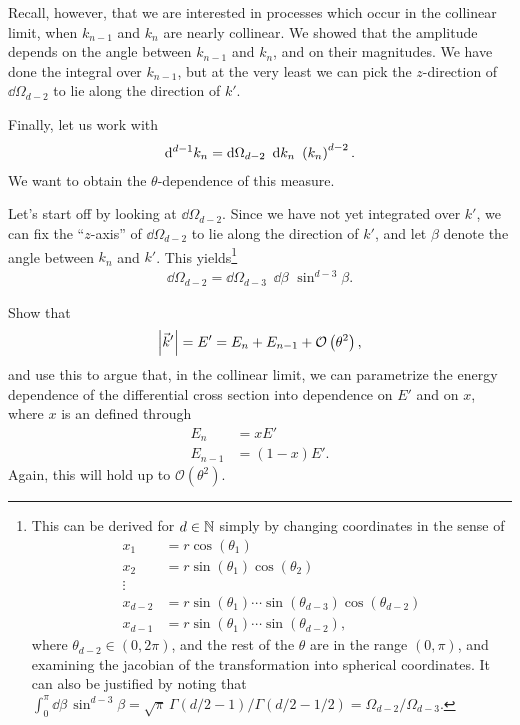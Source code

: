 Recall, however, that we are interested in processes which occur in the collinear limit, when \(k_{n-1}\) and \(k_{n}\) are nearly collinear.
%
We showed that the amplitude depends on the angle between \(k_{n-1}\) and \(k_n\), and on their magnitudes.
%
We have done the integral over \(k_{n-1}\), but at the very least we can pick the \(z\)-direction of \(\dd \Omega_{d-2}\) to lie along the direction of \(k'\).

Finally, let us work with
\begin{align}
    \label{eq:n_measure}
    \dd^{d-1} k_n
    =
    \dd \Omega_{d-2}
    \,\,\,
    \dd k_n
    \,\,
    \le(k_n\ri)^{d-2}
    .
\end{align}
%
We want to obtain the \(\theta\)-dependence of this measure.

Let's start off by looking at \(\dd \Omega_{d-2}\).
%
Since we have not yet integrated over \(k'\), we can fix the ``\(z\)-axis'' of \(\dd\Omega_{d-2}\) to lie along the direction of \(k'\), and let \(\beta\) denote the angle between \(k_n\) and \(k'\).
%
This yields\footnote{
    This can be derived for \(d \in \mathbb N\) simply by changing coordinates in the sense of
    \begin{align}
        x_1 &= r \cos(\theta_1)
        \\
        x_2 &= r \sin(\theta_1)\cos(\theta_2)
        \\
        \vdots
        \\
        x_{d-2} &= r \sin(\theta_1)\cdots\sin(\theta_{d-3})\cos(\theta_{d-2})
        \\
        x_{d-1} &= r \sin(\theta_1)\cdots\sin(\theta_{d-2})
        ,
    \end{align}
    where \(\theta_{d-2} \in (0, 2\pi)\), and the rest of the \(\theta\) are in the range \((0, \pi)\), and examining the jacobian of the transformation into spherical coordinates.
    It can also be justified by noting that \(\int_0^\pi \dd \beta\,\sin^{d-3}\beta = \sqrt{\pi}\,\Gamma(d/2-1)/\Gamma(d/2 - 1/2) = \Omega_{d-2}/\Omega_{d-3}\).
}
\begin{align}
    \dd \Omega_{d-2}
    =
    \dd \Omega_{d-3}
    \,\,\,
    \dd \beta
    \,\,
    \sin^{d-3}\beta
    .
\end{align}


\begin{exercise*}
    Show that
    \begin{align}
        \abs{\Vec{k}'}
        =
        E'
        =
        E_n + E_{n-1} + \mathcal{O}\left(\theta^2\right)
        ,
    \end{align}
    and use this to argue that, in the collinear limit, we can parametrize the energy dependence of the differential cross section into dependence on \(E'\) and on \(x\), where \(x\) is an  defined through
    \begin{align}
        E_n &= x E'
        \\
        E_{n-1} &= (1-x)E'
        .
    \end{align}
    Again, this will hold up to \(\mathcal{O}(\theta^2)\).
\end{exercise*}

